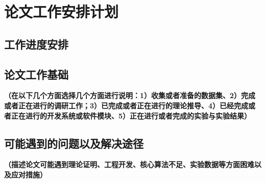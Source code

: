 \section{论文工作安排计划}

\subsection{工作进度安排}
\subsection{论文工作基础}


\textbf{\color{red}（在以下几个方面选择几个方面进行说明：1）收集或者准备的数据集、2）完成或者正在进行的调研工作；3）已完成或者正在进行的理论推导、4）已经完成或者正在进行的开发系统或软件模块、5）正在进行或者完成的实验与实验结果）}

\subsection{可能遇到的问题以及解决途径}
\textbf{\color{red}
（描述论文可能遇到理论证明、工程开发、核心算法不足、实验数据等方面困难以及应对措施）}